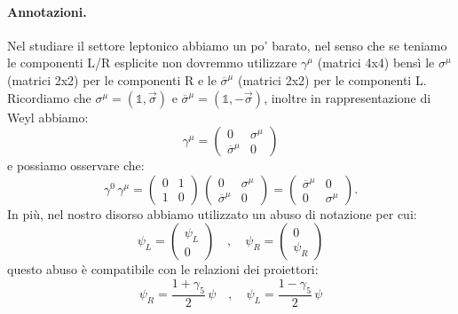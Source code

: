 \paragraph{Annotazioni.}Nel studiare il settore leptonico abbiamo un po' barato, nel senso che se teniamo le componenti L/R esplicite non dovremmo utilizzare $\gamma^\mu$ (matrici 4x4) bensì le $\sigma^\mu$ (matrici 2x2) per le componenti R e le $\overline{\sigma}^\mu$ (matrici 2x2) per le componenti L. Ricordiamo che $\sigma^\mu = (\mathbb{1},\vec{\sigma})$ e $\overline{\sigma}^\mu = (\mathbb{1},-\vec{\sigma})$, inoltre in rappresentazione di Weyl abbiamo:
\begin{equation}
    \gamma^\mu = \begin{pmatrix}
        0 & \sigma^\mu \\
        \overline{\sigma}^\mu & 0
    \end{pmatrix}
\end{equation}
e possiamo osservare che:
\begin{equation}
    \gamma^0\, \gamma^\mu = \begin{pmatrix}
        0 & 1 \\
        1 & 0
    \end{pmatrix}\, \begin{pmatrix}
        0 & \sigma^\mu \\
        \overline{\sigma}^\mu & 0
    \end{pmatrix} = \begin{pmatrix}
        \overline{\sigma}^\mu & 0 \\
        0 & \sigma^\mu
    \end{pmatrix}.
\end{equation}
In più, nel nostro disorso abbiamo utilizzato un abuso di notazione per cui:
\begin{equation}
    \psi_L = \begin{pmatrix}
        \psi_L \\
        0
    \end{pmatrix} \quad , \quad \psi_R = \begin{pmatrix}
        0 \\
        \psi_R
    \end{pmatrix}
\end{equation}
questo abuso è compatibile con le relazioni dei proiettori:
\begin{equation}
    \psi_R = \frac{1 + \gamma_5}{2}\, \psi \quad , \quad \psi_L = \frac{1-\gamma_5}{2}\, \psi
\end{equation}
